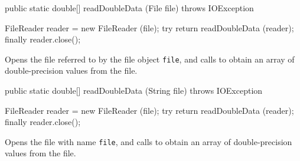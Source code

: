 \begin{code}

   public static double[] readDoubleData (File file) throws IOException\begin{hide} {
      FileReader reader = new FileReader (file);
      try {
         return readDoubleData (reader);
      }
      finally {
         reader.close();
      }
   }\end{hide}
\end{code}
\begin{tabb}   Opens the file referred to by the file object \texttt{file},
 and calls  to
 obtain an array of double-precision values from
 the file.
\end{tabb}
\begin{htmlonly}
\end{htmlonly}
\begin{code}

   public static double[] readDoubleData (String file) throws IOException\begin{hide} {
      FileReader reader = new FileReader (file);
      try {
         return readDoubleData (reader);
      }
      finally {
         reader.close();
      }
   }\end{hide}
\end{code}
\begin{tabb}   Opens the file with name \texttt{file},
 and calls  to
 obtain an array of double-precision values from
 the file.
\end{tabb}
\begin{htmlonly}
\end{htmlonly}
